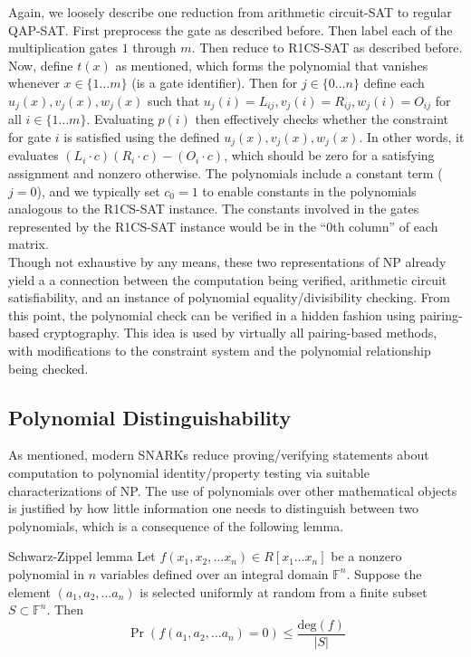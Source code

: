 \noindent Again, we loosely describe one reduction from arithmetic circuit-SAT to regular QAP-SAT. First preprocess the gate as described before. Then label each of the multiplication gates $1$ through $m$. Then reduce to R1CS-SAT as described before. Now, define $t(x)$ as mentioned, which forms the polynomial that vanishes whenever $x \in \{1 \dots m\}$ (is a gate identifier). Then for $j \in \{0 \dots n\}$ define each $u_j(x), v_j(x), w_j(x)$ such that $u_j(i) = L_{ij}, v_j(i) = R_{ij}, w_j(i) = O_{ij}$ for all $i \in \{1 \dots m\}$. Evaluating $p(i)$ then effectively checks whether the constraint for gate $i$ is satisfied using the defined $u_j(x), v_j(x), w_j(x)$. In other words, it evaluates $(L_i \cdot c) (R_i \cdot c) - (O_i \cdot c)$, which should be zero for a satisfying assignment and nonzero otherwise. The polynomials include a constant term ($j = 0$), and we typically set $c_0 = 1$ to enable constants in the polynomials analogous to the R1CS-SAT instance. The constants involved in the gates represented by the R1CS-SAT instance would be in the ``0th column'' of each matrix.\\

\noindent Though not exhaustive by any means, these two representations of NP already yield a a connection between the computation being verified, arithmetic circuit satisfiability, and an instance of polynomial equality/divisibility checking. From this point, the polynomial check can be verified in a hidden fashion using pairing-based cryptography. This idea is used by virtually all pairing-based methods, with modifications to the constraint system and the polynomial relationship being checked.

\subsection{Polynomial Distinguishability}
\noindent As mentioned, modern SNARKs reduce proving/verifying statements about computation to polynomial identity/property testing via suitable characterizations of NP. The use of polynomials over other mathematical objects is justified by how little information one needs to distinguish between two polynomials, which is a consequence of the following lemma.

\begin{lemma}{Schwarz-Zippel lemma}
\noindent Let $f(x_1, x_2, \dots x_n) \in R[x_1 \dots x_n]$ be a nonzero polynomial in $n$ variables defined over an integral domain $\mathbb{F}^{n}$. Suppose the element $(a_1, a_2, \dots a_n)$ is selected uniformly at random from a finite subset $S \subset \mathbb{F}^n$. Then 
$$
    \Pr(f(a_1, a_2, \dots a_n) = 0) \le \frac{\text{deg}(f)}{|S|}
$$
\end{lemma}

